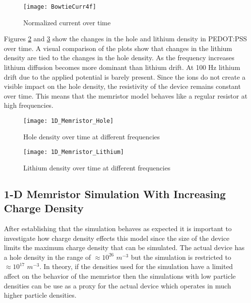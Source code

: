 \begin{doublespace}
\begin{figure}[!htp]
\centering
\texttt{[image: BowtieCurr4f]}
\caption{Normalized current over time} 
\label{BowtieCurr}
\end{figure}

Figures \ref{Bowhole} and \ref{Bowli} show the changes in the hole and lithium density in PEDOT:PSS over time. A visual comparison of the plots show that changes in the lithium density are tied to the changes in the hole density. As the frequency increases lithium diffusion becomes more dominant than lithium drift. At 100 Hz lithium drift due to the applied potential is barely present. Since the ions do not create a visible impact on the hole density, the resistivity of the device remains constant over time. This means that the memristor model behaves like a regular resistor at high frequencies.


\begin{figure}[!htp]
\centering
\texttt{[image: 1D\_Memristor\_Hole]}
\caption{Hole density over time at different frequencies} 
\label{Bowhole}
\end{figure}

\begin{figure}[!htp]
\centering
\texttt{[image: 1D\_Memristor\_Lithium]}
\caption{Lithium density over time at different frequencies} 
\label{Bowli}
\end{figure}


\clearpage
\subsection{1-D Memristor Simulation With Increasing Charge Density }

After establishing that the simulation behaves as expected it is important to investigate how charge density effects this model since the size of the device limits the maximum charge density that can be simulated. The actual device has a hole density in the range of $ \approx 10^{26}$ $m^{-3}$ but the simulation is restricted to $\approx 10^{17}$ $m^{-3}$. In theory, if the densities used for the simulation  have a limited affect on the behavior of the memristor then the simulations with low particle densities can be use as a proxy for the actual device which operates in much higher particle densities.


\end{doublespace}
